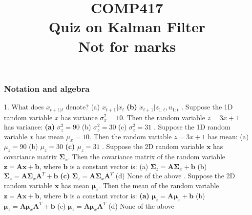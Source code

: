 \documentclass[a4paper,10pt]{article}
\date{\displaydate{date}}
\title{COMP417\\Quiz on Kalman Filter\\Not for marks}
\begin{document}
\maketitle

\subsubsection*{Notation and algebra}
1. What does $x_{t+1|t}$ denote? 
\newline
(a) $x_{t+1}|x_t$
\newline
\textbf{(b)} $x_{t+1}|z_{1:t}, u_{1:t}$
\newline
{}. Suppose the 1D random variable $x$ has variance $\sigma_x^2=10$. Then the random variable $z=3x+1$ has variance:
\newline
\textbf{(a)} $\sigma_z^2=90$
\newline
(b) $\sigma_z^2=30$
\newline
(c) $\sigma_z^2=31$
\newline
{}. Suppose the 1D random variable $x$ has mean $\mu_x=10$. Then the random variable $z=3x+1$ has mean:
\newline
(a) $\mu_z=90$
\newline
(b) $\mu_z=30$
\newline
\textbf{(c)} $\mu_z=31$
\newline
{}. Suppose the 2D random variable $\textbf{x}$ has covariance matrix $\boldsymbol{\Sigma}_x$. Then the covariance matrix of the random variable $\textbf{z}=\textbf{A}\boldsymbol{x} + \textbf{b}$, where $\textbf{b}$ is a 
constant vector is:
\newline
(a) $\boldsymbol{\Sigma}_z=\textbf{A}\boldsymbol{\Sigma}_x + \textbf{b}$ 
\newline
(b) $\boldsymbol{\Sigma}_z=\textbf{A}\boldsymbol{\Sigma}_x\textbf{A}^T + \textbf{b}$ 
\newline
\textbf{(c)} $\boldsymbol{\Sigma}_z=\textbf{A}\boldsymbol{\Sigma}_x\textbf{A}^T$ 
\newline
(d) None of the above
\newline
{}. Suppose the 2D random variable $\textbf{x}$ has mean $\boldsymbol{\mu}_x$. Then the mean of the random variable $\textbf{z}=\textbf{A}\boldsymbol{x} + \textbf{b}$, where $\textbf{b}$ is a 
constant vector is:
\newline
\textbf{(a)} $\boldsymbol{\mu}_z=\textbf{A}\boldsymbol{\mu}_x + \textbf{b}$ 
\newline
(b) $\boldsymbol{\mu}_z=\textbf{A}\boldsymbol{\mu}_x\textbf{A}^T + \textbf{b}$ 
\newline
(c) $\boldsymbol{\mu}_z=\textbf{A}\boldsymbol{\mu}_x\textbf{A}^T$ 
\newline
(d) None of the above
\newline
\newline
\end{document}
